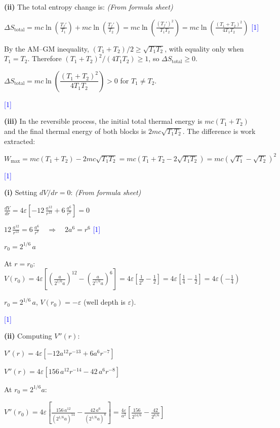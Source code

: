 \documentclass[12pt,a4paper]{article}
\newcommand{\markstep}[1]{\hfill\textcolor{blue}{[#1]}}
\newcommand{\finalanswer}[1]{%
  \begin{tcolorbox}[colback=green!5!white,colframe=green!50!black,boxrule=0.5pt]
  #1
  \end{tcolorbox}
}
\newcommand{\fromsheet}{\textit{(From formula sheet)}}
\begin{document}
\begin{parts}
\textbf{(ii)} The total entropy change is: \fromsheet

$\Delta S_\text{total} = mc\ln\!\left(\frac{T_f'}{T_1}\right) + mc\ln\!\left(\frac{T_f'}{T_2}\right) = mc\ln\!\left(\frac{(T_f')^2}{T_1 T_2}\right) = mc\ln\!\left(\frac{(T_1+T_2)^2}{4T_1 T_2}\right)$ \markstep{1}

By the AM--GM inequality, $(T_1 + T_2)/2 \geq \sqrt{T_1 T_2}$, with equality only when $T_1 = T_2$. Therefore $(T_1+T_2)^2/(4T_1T_2) \geq 1$, so $\Delta S_\text{total} \geq 0$.

\finalanswer{$\Delta S_\text{total} = mc\ln\!\left(\dfrac{(T_1+T_2)^2}{4T_1 T_2}\right) > 0$ for $T_1 \neq T_2$.} \markstep{1}

\textbf{(iii)} In the reversible process, the initial total thermal energy is $mc(T_1 + T_2)$ and the final thermal energy of both blocks is $2mc\sqrt{T_1T_2}$. The difference is work extracted:

\finalanswer{$W_\text{max} = mc(T_1 + T_2) - 2mc\sqrt{T_1 T_2} = mc\!\left(T_1 + T_2 - 2\sqrt{T_1 T_2}\right) = mc\!\left(\sqrt{T_1} - \sqrt{T_2}\right)^2$} \markstep{1}

\item

\textbf{(i)} Setting $dV/dr = 0$: \fromsheet

$\frac{dV}{dr} = 4\varepsilon\left[-12\,\frac{a^{12}}{r^{13}} + 6\,\frac{a^6}{r^7}\right] = 0$

$12\,\frac{a^{12}}{r^{13}} = 6\,\frac{a^6}{r^7} \quad\Longrightarrow\quad 2a^6 = r^6$ \markstep{1}

$r_0 = 2^{1/6}\,a$

At $r = r_0$: $V(r_0) = 4\varepsilon\!\left[\left(\frac{a}{2^{1/6}a}\right)^{12} - \left(\frac{a}{2^{1/6}a}\right)^{6}\right] = 4\varepsilon\!\left[\frac{1}{2^2} - \frac{1}{2}\right] = 4\varepsilon\!\left[\frac{1}{4} - \frac{1}{2}\right] = 4\varepsilon\!\left(-\frac{1}{4}\right)$

\finalanswer{$r_0 = 2^{1/6}\,a$, \quad $V(r_0) = -\varepsilon$ (well depth is $\varepsilon$).} \markstep{1}

\textbf{(ii)} Computing $V''(r)$:

$V'(r) = 4\varepsilon\!\left[-12a^{12}r^{-13} + 6a^6 r^{-7}\right]$

$V''(r) = 4\varepsilon\!\left[156\,a^{12}r^{-14} - 42\,a^6 r^{-8}\right]$

At $r_0 = 2^{1/6}a$:

$V''(r_0) = 4\varepsilon\!\left[\frac{156\,a^{12}}{(2^{1/6}a)^{14}} - \frac{42\,a^6}{(2^{1/6}a)^{8}}\right] = \frac{4\varepsilon}{a^2}\!\left[\frac{156}{2^{14/6}} - \frac{42}{2^{8/6}}\right]$


\end{parts}
\end{document}

